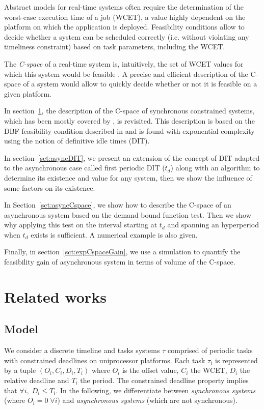 \documentclass[conference]{IEEEtran}
\begin{document}
	Abstract models for real-time systems often require the determination of the
	worst-case execution time of a job (WCET), a value highly dependent on the
	platform on which the application is deployed. Feasibility conditions allow to
	decide whether a system can be scheduled correctly (i.e. without violating any
	timeliness constraint) based on task parameters, including the WCET.

	The \emph{C-space} of a real-time system is, intuitively,
	the set of WCET values for which this system would be feasible
	\cite{bini2004schedulability,george2009characterization}. A precise and efficient description of the C-space of a system would allow to quickly decide
	whether or not it is feasible on a given platform.

	In section~\ref{sct:relatedWorks}, the description of the C-space of synchronous
	constrained systems, which has been mostly covered by \cite{george2009characterization}, is revisited.
	This description is based on the DBF feasibility condition described in
	\cite{baruah1999generalized,baruah1990algorithms} and is found with exponential complexity using
	the notion of definitive idle times (DIT).

	In section~\ref{sct:asyncDIT}, we present an extension of the concept of DIT adapted to the
	asynchronous case called first periodic DIT
	($t_d$) along with an algorithm to determine its existence and value for any system,
	then we show the influence of some factors on its existence.

	In Section~\ref{sct:asyncCspace}, we show how to describe the C-space of an asynchronous
	system based on the demand bound function test. Then we show why applying this
	test on the interval starting at $t_d$
	and spanning an hyperperiod when $t_d$ exists is sufficient. A
	numerical example is also given.

	Finally, in section~\ref{sct:expCspaceGain}, we use a simulation to quantify the feasibility
	gain of asynchronous system in terms of volume of the C-space.

\section{Related works}
\label{sct:relatedWorks}


	\subsection{Model}
		We consider a discrete timeline and tasks systems $\tau$ comprised of periodic
		tasks with constrained deadlines on uniprocessor platforms. Each task
		$\tau_i$ is represented by a tuple $(O_i, C_i, D_i, T_i)$ where $O_i$ is the offset value,
		$C_i$ the WCET, $D_i$ the relative deadline and $T_i$ the period.
		The constrained deadline property implies that $\forall i,\; D_i \leq T_i$. In
		the following, we differentiate between \emph{synchronous systems} (where $O_i
		= 0 \; \forall i$) and \emph{asynchronous systems} (which are not synchronous).
\end{document}
